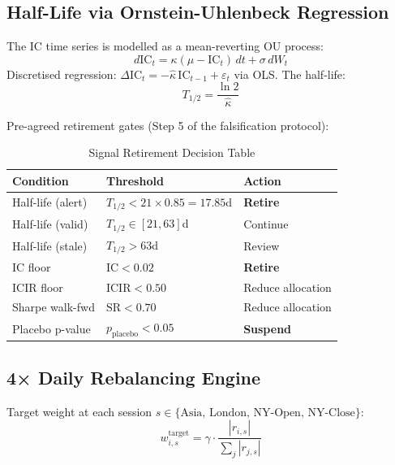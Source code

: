 \documentclass[12pt,a4paper]{article}
\begin{document}
\subsection{Half-Life via Ornstein-Uhlenbeck Regression}

The IC time series is modelled as a mean-reverting OU process:
\begin{equation}
  d\text{IC}_t = \kappa(\mu - \text{IC}_t)\,dt + \sigma\,dW_t
  \label{eq:ou}
\end{equation}
Discretised regression: $\Delta\text{IC}_t = -\hat{\kappa}\,\text{IC}_{t-1} + \varepsilon_t$ via OLS. The half-life:
\begin{equation}
  T_{1/2} = \frac{\ln 2}{\hat{\kappa}}
  \label{eq:halflife}
\end{equation}

Pre-agreed retirement gates (Step 5 of the falsification protocol):

\begin{table}[h]
\centering
\caption{Signal Retirement Decision Table}
\begin{tabular}{lll}
\toprule
Condition & Threshold & Action \\
\midrule
Half-life (alert) & $T_{1/2} < 21 \times 0.85 = 17.85$d & \textbf{Retire} \\
Half-life (valid) & $T_{1/2} \in [21, 63]$d & Continue \\
Half-life (stale) & $T_{1/2} > 63$d & Review \\
IC floor & $\text{IC} < 0.02$ & \textbf{Retire} \\
ICIR floor & $\text{ICIR} < 0.50$ & Reduce allocation \\
Sharpe walk-fwd & $\text{SR} < 0.70$ & Reduce allocation \\
Placebo p-value & $p_{\text{placebo}} < 0.05$ & \textbf{Suspend} \\
\bottomrule
\end{tabular}
\end{table}

\subsection{4× Daily Rebalancing Engine}

Target weight at each session $s \in \{\text{Asia, London, NY-Open, NY-Close}\}$:
\begin{equation}
  w_{i,s}^{\text{target}} = \gamma \cdot \frac{|r_{i,s}|}{\sum_j |r_{j,s}|}
  \label{eq:target_weight}
\end{equation}
\end{document}
